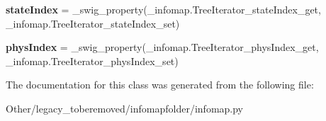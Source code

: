 \begin{DoxyCompactItemize}
\mbox{\label{classinfomapfolder_1_1infomap_1_1TreeIterator_a1276bf77ccee4cedaa3e02f66d41a1bc}} 
{\bfseries state\+Index} = \+\_\+swig\+\_\+property(\+\_\+infomap.\+Tree\+Iterator\+\_\+state\+Index\+\_\+get, \+\_\+infomap.\+Tree\+Iterator\+\_\+state\+Index\+\_\+set)
\item 
\mbox{\label{classinfomapfolder_1_1infomap_1_1TreeIterator_a1b0b1f5237bab28352816c18e20facdf}} 
{\bfseries phys\+Index} = \+\_\+swig\+\_\+property(\+\_\+infomap.\+Tree\+Iterator\+\_\+phys\+Index\+\_\+get, \+\_\+infomap.\+Tree\+Iterator\+\_\+phys\+Index\+\_\+set)
\end{DoxyCompactItemize}


The documentation for this class was generated from the following file\+:\begin{DoxyCompactItemize}
\item 
Other/legacy\+\_\+toberemoved/infomapfolder/infomap.\+py\end{DoxyCompactItemize}
